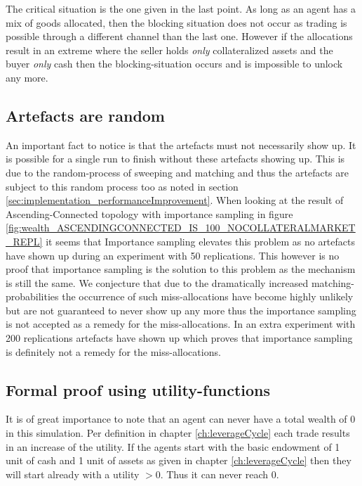 \documentclass[Bachelorarbeit.tex]{subfiles}
\begin{document}
The critical situation is the one given in the last point. As long as an agent has a mix of goods allocated, then the blocking situation does not occur as trading is possible through a different channel than the last one. However if the allocations result in an extreme where the seller holds \textit{only} collateralized assets and the buyer \textit{only} cash then the blocking-situation occurs and is impossible to unlock any more.

\subsection{Artefacts are random} An important fact to notice is that the artefacts must not necessarily show up. It is possible for a single run to finish without these artefacts showing up. This is due to the random-process of sweeping and matching and thus the artefacts are subject to this random process too as noted in section \ref{sec:implementation_performanceImprovement}. When looking at the result of Ascending-Connected topology with importance sampling in figure \ref{fig:wealth_ASCENDINGCONNECTED_IS_100_NOCOLLATERALMARKET_REPL} it seems that Importance sampling elevates this problem as no artefacts have shown up during an experiment with 50 replications. This however is no proof that importance sampling is the solution to this problem as the mechanism is still the same. We conjecture that due to the dramatically increased matching-probabilities the occurrence of such miss-allocations have become highly unlikely but are not guaranteed to never show up any more thus the importance sampling is not accepted as a remedy for the miss-allocations. In an extra experiment with 200 replications artefacts have shown up which proves that importance sampling is definitely not a remedy for the miss-allocations.

\subsection{Formal proof using utility-functions}
It is of great importance to note that an agent can never have a total wealth of 0 in this simulation. Per definition in chapter \ref{ch:leverageCycle} each trade results in an increase of the utility. If the agents start with the basic endowment of 1 unit of cash and 1 unit of assets as given in chapter \ref{ch:leverageCycle} then they will start already with a utility $> 0$. Thus it can never reach 0.

\medskip
\end{document}
